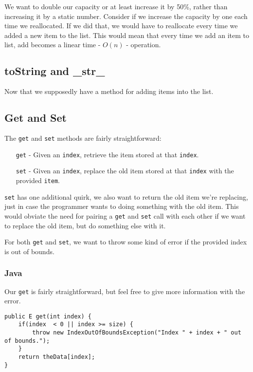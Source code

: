 We want to double our capacity or at least increase it by 50\%, rather than increasing it by a static number.
Consider if we increase the capacity by one each time we reallocated.  
If we did that, we would have to reallocate every time we added a new item to the list.  
This would mean that every time we add an item to list, add becomes a linear time - $O(n)$ - operation.


\subsection{toString and \_str\_}
Now that we supposedly have a method for adding items into the list.


\subsection{Get and Set}
The \texttt{get} and \texttt{set} methods are fairly straightforward:
\begin{enumerate}
\item[\texttt{get} -] Given an \texttt{index}, retrieve the item stored at that \texttt{index}.
\item[\texttt{set} -] Given an \texttt{index}, replace the old item stored at that \texttt{index} with the provided \texttt{item}.
\end{enumerate}
\texttt{set} has one additional quirk, we also want to return the old item we're replacing, just in case the programmer wants to doing something with the old item.
This would obviate the need for pairing a \texttt{get} and \texttt{set} call with each other if we want to replace the old item, but do something else with it. 

For both \texttt{get} and \texttt{set}, we want to throw some kind of error if the provided index is out of bounds.
\subsubsection{Java}
Our \texttt{get} is fairly straightforward, but feel free to give more information with the error.
\begin{verbatim}
public E get(int index) {
	if(index  < 0 || index >= size) {
		throw new IndexOutOfBoundsException("Index " + index + " out of bounds.");
	}
	return theData[index];
}
\end{verbatim}

